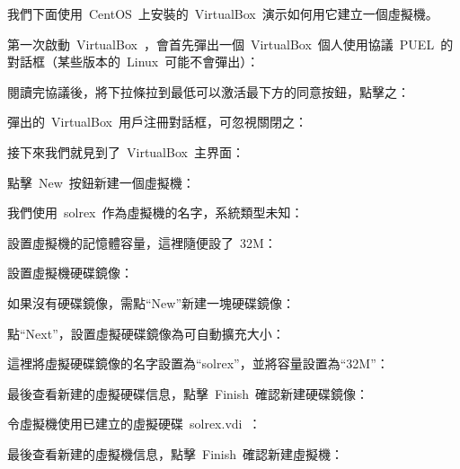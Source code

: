 我們下面使用~CentOS~上安裝的~VirtualBox~演示如何用它建立一個虛擬機。

第一次啟動~VirtualBox~，會首先彈出一個~VirtualBox~個人使用協議~PUEL~的對話框（某些版本的~Linux~可能不會彈出）：\\

閱讀完協議後，將下拉條拉到最低可以激活最下方的同意按鈕，點擊之：\\

彈出的~VirtualBox~用戶注冊對話框，可忽視關閉之：\\

接下來我們就見到了~VirtualBox~主界面：\\

點擊~New~按鈕新建一個虛擬機：\\

我們使用~solrex~作為虛擬機的名字，系統類型未知：\\

設置虛擬機的記憶體容量，這裡隨便設了~32M：\\

設置虛擬機硬碟鏡像：\\

如果沒有硬碟鏡像，需點“New”新建一塊硬碟鏡像：\\

點“Next”，設置虛擬硬碟鏡像為可自動擴充大小：\\

這裡將虛擬硬碟鏡像的名字設置為“solrex”，並將容量設置為“32M”：\\

最後查看新建的虛擬硬碟信息，點擊~Finish~確認新建硬碟鏡像：\\

令虛擬機使用已建立的虛擬硬碟~solrex.vdi~：\\

最後查看新建的虛擬機信息，點擊~Finish~確認新建虛擬機：\\

